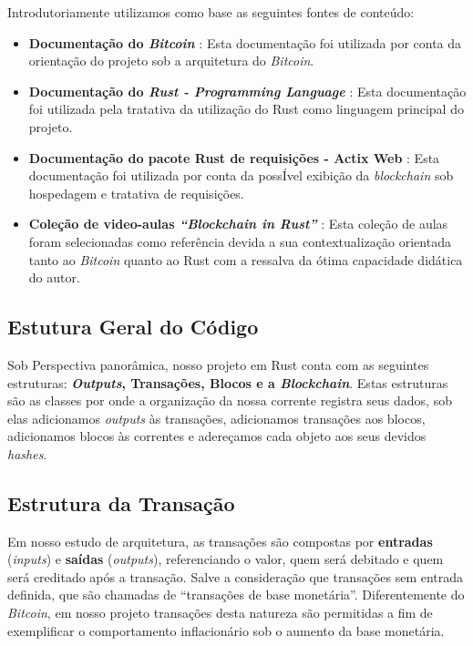 \documentclass[article,12pt,oneside,a4paper,english,brazil]{unifil}
\begin{document}
\begin{Spacing}{1.5}
Introdutoriamente utilizamos como base as seguintes fontes de conteúdo:
\begin{itemize}
    \item \textbf{Documentação do \textit{Bitcoin}} \cite{nakamoto2008bitcoin}: Esta documentação foi utilizada por conta da orientação do projeto sob a arquitetura do \textit{Bitcoin}.

    \item \textbf{Documentação do \textit{Rust - Programming Language}} \cite{rust_learn}: Esta documentação foi utilizada pela tratativa da utilização do Rust como linguagem principal do projeto.

    \item \textbf{Documentação do pacote Rust de requisições - Actix Web} \cite{actix_docs}: Esta documentação foi utilizada por conta da possÍvel exibição da \textit{blockchain} sob hospedagem e tratativa de requisições.

    \item \textbf{Coleção de video-aulas \textit{``Blockchain in Rust''}} \cite{geeklaunch_rust}: Esta coleção de aulas foram selecionadas como referência devida a sua contextualização orientada tanto ao \textit{Bitcoin} quanto ao Rust com a ressalva da ótima capacidade didática do autor.
\end{itemize}

\subsection*{Estutura Geral do Código}

Sob Perspectiva panorâmica, nosso projeto em Rust conta com as seguintes estruturas: \textbf{\textit{Outputs}, Transações, Blocos e a \textit{Blockchain}}. Estas estruturas são as classes por onde a organização da nossa corrente registra seus dados, sob elas adicionamos \textit{outputs} às transações, adicionamos transações aos blocos, adicionamos blocos às correntes e adereçamos cada objeto aos seus devidos \textit{hashes}.

\subsection*{Estrutura da Transação}

Em nosso estudo de arquitetura, as transações são compostas por
\textbf{entradas} (\textit{inputs}) e \textbf{saídas} (\textit{outputs}), referenciando o valor, quem será debitado e quem será creditado após a transação. Salve a consideração que transações sem entrada definida, que são chamadas de ``transações de base monetária''. Diferentemente do \textit{Bitcoin}, em nosso projeto transações desta natureza são permitidas a fim de exemplificar o comportamento inflacionário sob o aumento da base monetária.


\end{Spacing}
\end{document}
